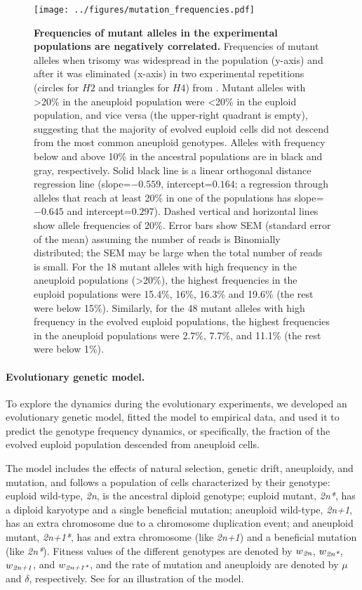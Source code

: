 \documentclass[12pt]{extarticle}
\newcommand{\euwt}{\emph{2n}}
\newcommand{\anwt}{\emph{2n+1}}
\newcommand{\eumt}{\emph{2n*}}
\newcommand{\anmt}{\emph{2n+1*}}
\begin{document}
\begin{figure}[h]
  \centering
    \texttt{[image: ../figures/mutation\_frequencies.pdf]}      
  \caption{
    \textbf{Frequencies of mutant alleles in the experimental populations are negatively correlated.} 
    Frequencies of mutant alleles when trisomy was widespread in the population (y-axis) and after it was eliminated (x-axis) in two experimental repetitions (circles for $H2$ and triangles for $H4$) from \citet{Yona2012}. Mutant alleles with >20\% in the aneuploid population were <20\% in the euploid population, and vice versa (the upper-right quadrant is empty), suggesting that the majority of evolved euploid cells did not descend from the most common aneuploid genotypes. 
Alleles with frequency below and above 10\% in the ancestral populations are in black and gray, respectively. 
Solid black line is a linear orthogonal distance regression line (slope=$-0.559$, intercept=$0.164$; a regression through alleles that reach at least 20\% in one of the populations has slope=$-0.645$ and intercept=$0.297$).
Dashed vertical and horizontal lines show allele frequencies of 20\%.
Error bars show SEM (standard error of the mean) assuming the number of reads is Binomially distributed; the SEM may be large when the total number of reads is small.
For the 18 mutant alleles with high frequency in the aneuploid populations (>20\%), the highest frequencies in the euploid populations were 15.4\%, 16\%, 16.3\% and 19.6\% (the rest were below 15\%).
Similarly, for the 48 mutant alleles with high frequency in the evolved euploid populations, the highest frequencies in the aneuploid populations were 2.7\%, 7.7\%, and 11.1\% (the rest were below 1\%). 
}
  \label{fig:mutation_frequencies}
\end{figure}


\paragraph{Evolutionary genetic model.} 
To explore the dynamics during the evolutionary experiments, we developed an evolutionary genetic model, fitted the model to empirical data, and used it to predict the genotype frequency dynamics, or specifically, the fraction of the evolved euploid population descended from aneuploid cells. 

The model includes the effects of natural selection, genetic drift, aneuploidy, and mutation, and follows a population of cells characterized by their genotype: 
euploid wild-type, \euwt, is the ancestral diploid genotype; 
euploid mutant, \eumt, has a diploid karyotype and a single beneficial mutation; 
aneuploid wild-type, \anwt, has an extra chromosome due to a chromosome duplication event; and
aneuploid mutant, \anmt, has and extra chromosome (like \anwt) and a beneficial mutation (like \eumt).
Fitness values of the different genotypes are denoted by $w_{\euwt}$, $w_{\eumt}$, $w_{\anwt}$, and $w_{\anmt}$, and the rate of mutation and aneuploidy are denoted by $\mu$ and $\delta$, respectively.
See  for an illustration of the model.
\end{document}
